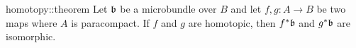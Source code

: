 \begin{mytheorem}{homotopy::theorem}{}
    Let $\mathfrak{b}$ be a microbundle over $B$ and let $f, g: A \to B$ be two maps where $A$ is paracompact.
    If $f$ and $g$ are homotopic, then $f^*\mathfrak{b}$ and $g^*\mathfrak{b}$ are isomorphic.
\end{mytheorem}